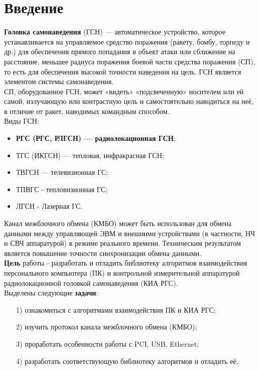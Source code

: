 \section*{Введение}

\textbf{Головка самонаведения} (ГСН) — автоматическое устройство, которое устанавливается на управляемое средство поражения (ракету, бомбу, торпеду и др.) для обеспечения прямого попадания в объект атаки или сближение на расстояние, меньшее радиуса поражения боевой части средства поражения (СП), то есть для обеспечения высокой точности наведения на цель. ГСН является элементом системы самонаведения. \cite{book1} \\

СП, оборудованное ГСН, может «видеть» «подсвеченную» носителем или ей самой, излучающую или контрастную цель и самостоятельно наводиться на неё, в отличие от ракет, наводимых командным способом. \\

Виды ГСН:
\begin{itemize}
	\item \textbf{РГС (РГС, РЛГСН) — радиолокационная ГСН};
	\item ТГС (ИКГСН) — тепловая, инфракрасная ГСН;
	\item ТВГСН — телевизионная ГС;
	\item ТПВГС - тепловизионная ГС;
	\item ЛГСН - Лазерная ГС.
\end{itemize}

Канал межблочного обмена (КМБО) может быть использован для обмена данными между управляющей ЭВМ и внешними устройствами (в частности, НЧ и СВЧ аппаратурой) в режиме реального времени. Техническим результатом является повышение точности синхронизации обмена данными. \cite{book2} \\

\textbf{Цель} работы - разработать и отладить библиотеку алгоритмов взаимодействия персонального компьютера (ПК) и контрольной измерительной аппаратурой радиолокационной головкой самонаведения (КИА РГС). \\

Выделены следующие \textbf{задачи}:
\begin{enumerate}
	\item[1)] ознакомиться с алгоритмами взаимодействия ПК и КИА РГС;
	\item[2)] изучить протокол канала межблочного обмена (КМБО);
	\item[3)] проработать особенности работы с PCI, USB, Ethernet;
	\item[4)] разработать соответствующую библиотеку алгоритмов и отладить её.
\end{enumerate}